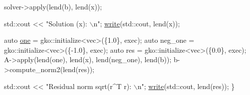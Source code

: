 \begin{DoxyCodeInclude}
    solver->apply(lend(b), lend(x));

    std::cout << \textcolor{stringliteral}{"Solution (x): \(\backslash\)n"};
    \hyperlink{namespacegko_a859dc47a462721d83728d91ab7fa2148}{write}(std::cout, lend(x));

    \textcolor{keyword}{auto} \hyperlink{namespacegko_a0059e27f8f4bc348ff65c1e60caf47c8}{one} = gko::initialize<vec>(\{1.0\}, exec);
    \textcolor{keyword}{auto} neg\_one = gko::initialize<vec>(\{-1.0\}, exec);
    \textcolor{keyword}{auto} res = gko::initialize<vec>(\{0.0\}, exec);
    A->apply(lend(one), lend(x), lend(neg\_one), lend(b));
    b->compute\_norm2(lend(res));

    std::cout << \textcolor{stringliteral}{"Residual norm sqrt(r^T r): \(\backslash\)n"};
    \hyperlink{namespacegko_a859dc47a462721d83728d91ab7fa2148}{write}(std::cout, lend(res));
\}
\end{DoxyCodeInclude}
 